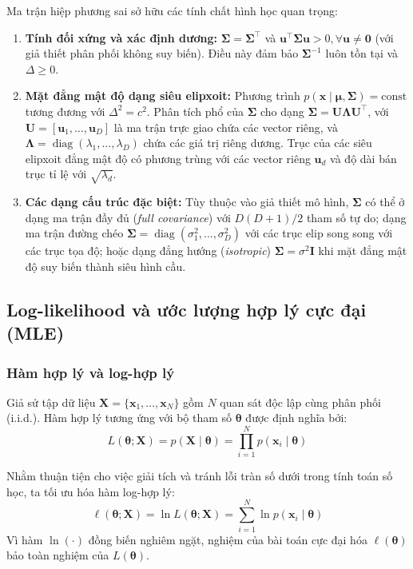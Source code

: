 \documentclass[12pt,a4paper]{article}
\newcommand{\vx}{\mathbf{x}}
\newcommand{\vu}{\mathbf{u}}
\newcommand{\vmu}{\boldsymbol{\mu}}
\newcommand{\vSigma}{\boldsymbol{\Sigma}}
\newcommand{\vtheta}{\boldsymbol{\theta}}
\newcommand{\vI}{\mathbf{I}}
\newcommand{\bX}{\mathbf{X}}
\newcommand{\bLambda}{\boldsymbol{\Lambda}}
\DeclareMathOperator{\diag}{diag}
\begin{document}
Ma trận hiệp phương sai sở hữu các tính chất hình học quan trọng:
\begin{enumerate}
    \item \textbf{Tính đối xứng và xác định dương:} $\vSigma = \vSigma^\top$ và $\vu^\top \vSigma \vu > 0, \forall \vu \neq \mathbf{0}$ (với giả thiết phân phối không suy biến). Điều này đảm bảo $\vSigma^{-1}$ luôn tồn tại và $\Delta \ge 0$.
    \item \textbf{Mặt đẳng mật độ dạng siêu elipxoit:} Phương trình $p(\vx \mid \vmu, \vSigma) = \text{const}$ tương đương với $\Delta^2 = c^2$. Phân tích phổ của $\vSigma$ cho dạng $\vSigma = \mathbf{U} \bLambda \mathbf{U}^\top$, với $\mathbf{U} = [\vu_1, \dots, \vu_D]$ là ma trận trực giao chứa các vector riêng, và $\bLambda = \diag(\lambda_1, \dots, \lambda_D)$ chứa các giá trị riêng dương. Trục của các siêu elipxoit đẳng mật độ có phương trùng với các vector riêng $\vu_d$ và độ dài bán trục tỉ lệ với $\sqrt{\lambda_d}$.
    \item \textbf{Các dạng cấu trúc đặc biệt:} Tùy thuộc vào giả thiết mô hình, $\vSigma$ có thể ở dạng ma trận đầy đủ (\textit{full covariance}) với $D(D+1)/2$ tham số tự do; dạng ma trận đường chéo $\vSigma = \diag(\sigma_1^2, \dots, \sigma_D^2)$ với các trục elip song song với các trục tọa độ; hoặc dạng đẳng hướng (\textit{isotropic}) $\vSigma = \sigma^2 \vI$ khi mặt đẳng mật độ suy biến thành siêu hình cầu.
\end{enumerate}

\subsection{Log-likelihood và ước lượng hợp lý cực đại (MLE)}
\label{subsec:mle}

\subsubsection{Hàm hợp lý và log-hợp lý}

Giả sử tập dữ liệu $\bX = \{\vx_1, \dots, \vx_N\}$ gồm $N$ quan sát độc lập cùng phân phối (i.i.d.). Hàm hợp lý tương ứng với bộ tham số $\vtheta$ được định nghĩa bởi:
\begin{equation}
    L(\vtheta ; \bX) = p(\bX \mid \vtheta) = \prod_{i=1}^{N} p(\vx_i \mid \vtheta)
\end{equation}

Nhằm thuận tiện cho việc giải tích và tránh lỗi tràn số dưới trong tính toán số học, ta tối ưu hóa hàm log-hợp lý:
\begin{equation}
    \ell(\vtheta ; \bX) = \ln L(\vtheta ; \bX) = \sum_{i=1}^{N} \ln p(\vx_i \mid \vtheta)
\end{equation}
Vì hàm $\ln(\cdot)$ đồng biến nghiêm ngặt, nghiệm của bài toán cực đại hóa $\ell(\vtheta)$ bảo toàn nghiệm của $L(\vtheta)$.
\end{document}
